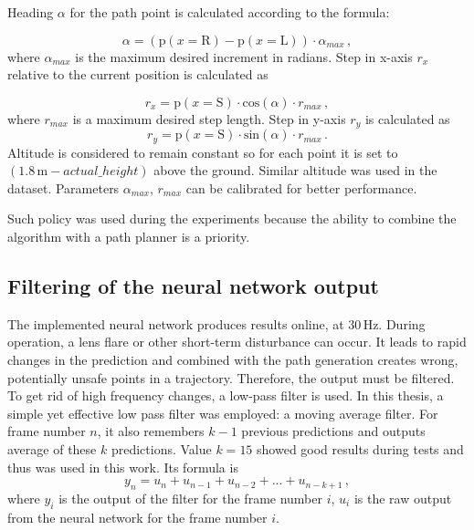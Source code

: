 Heading $\alpha$ for the path point is calculated according to the formula:

\begin{equation}
	\alpha = (\textrm{p}(x = \textrm{R}) - \textrm{p}(x = \textrm{L}))\cdot \alpha_{max}\,,
\end{equation}
where $\alpha_{max}$ is the maximum desired increment in radians. Step in x-axis $r_x$ relative to the current position is calculated as

\begin{equation}
	r_x = \textrm{p}(x = \textrm{S})\cdot \textrm{cos}(\alpha)\cdot r_{max}\,,
\end{equation}
where $r_{max}$ is a maximum desired step length. Step in y-axis $r_y$ is calculated as
\begin{equation}
	r_y = \textrm{p}(x = \textrm{S})\cdot \textrm{sin}(\alpha)\cdot r_{max}\,.
\end{equation}
Altitude is considered to remain constant so for each point it is set to $(1.8\,\textrm{m} - actual\_height)$ above the ground. Similar altitude was used in the dataset. Parameters $\alpha_{max}$, $r_{max}$ can be calibrated for better performance.

Such policy was used during the experiments because the ability to combine the algorithm with a path planner is a priority.

\subsection{Filtering of the neural network output}

The implemented neural network produces results online, at 30\,Hz. During operation, a lens flare or other short-term disturbance can occur. It leads to rapid changes in the prediction and combined with the path generation creates wrong, potentially unsafe points in a trajectory. Therefore, the output must be filtered. To get rid of high frequency changes, a low-pass filter is used. In this thesis, a simple yet effective low pass filter was employed: a moving average filter. For frame number $n$, it also remembers $k-1$ previous predictions and outputs average of these $k$ predictions. Value $k=15$ showed good results during tests and thus was used in this work. Its formula is
\begin{equation}
	y_n = u_n + u_{n-1} + u_{n-2} + ... + u_{n-k+1}\,,
\end{equation}
where $y_i$ is the output of the filter for the frame number $i$, $u_i$ is the raw output from the neural network for the frame number $i$.


